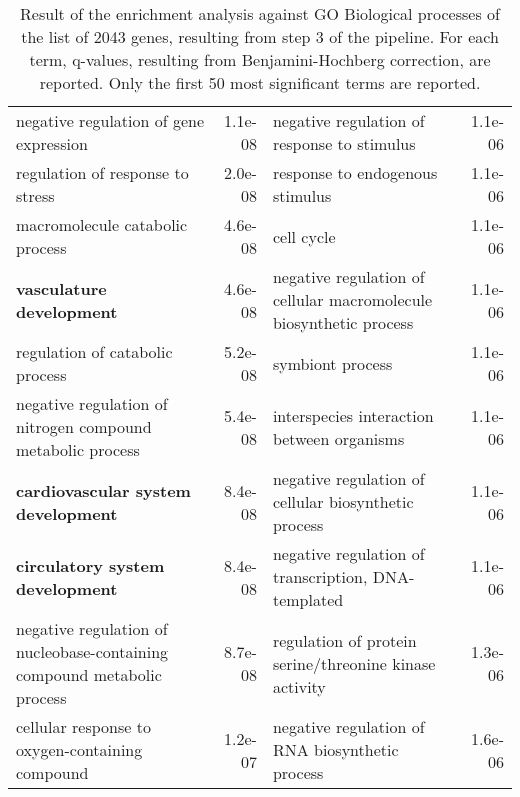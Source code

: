 \documentclass[fleqn,10pt]{SelfArx} %
\begin{document}
\begin{table}[!htb]
\begin{tabularx}{\textwidth}{lRlR}
		negative regulation of gene expression & 1.1e-08 & negative regulation of response to stimulus & 1.1e-06 \\ 
		regulation of response to stress & 2.0e-08 & response to endogenous stimulus & 1.1e-06 \\ 
		macromolecule catabolic process & 4.6e-08 & cell cycle & 1.1e-06 \\ 
		\textbf{vasculature development} & 4.6e-08 & negative regulation of cellular macromolecule biosynthetic process & 1.1e-06 \\ 
		regulation of catabolic process & 5.2e-08 & symbiont process & 1.1e-06 \\ 
		negative regulation of nitrogen compound metabolic process & 5.4e-08 & interspecies interaction between organisms & 1.1e-06 \\ 
		\textbf{cardiovascular system development} & 8.4e-08 & negative regulation of cellular biosynthetic process & 1.1e-06 \\ 
		\textbf{circulatory system development} & 8.4e-08 & negative regulation of transcription, DNA-templated & 1.1e-06 \\ 
		negative regulation of nucleobase-containing compound metabolic process & 8.7e-08 & regulation of protein serine/threonine kinase activity & 1.3e-06 \\ 
		cellular response to oxygen-containing compound & 1.2e-07 & negative regulation of RNA biosynthetic process & 1.6e-06 \\ 
	\end{tabularx}
	\smallskip
	\caption{Result of the enrichment analysis against GO Biological processes of the list of 2043 genes, resulting from step 3 of the pipeline. For each term, q-values, resulting from Benjamini-Hochberg correction, are reported. Only the first 50 most significant terms are reported.}
	\label{tab:bp2043}
\end{table}
\end{document}
